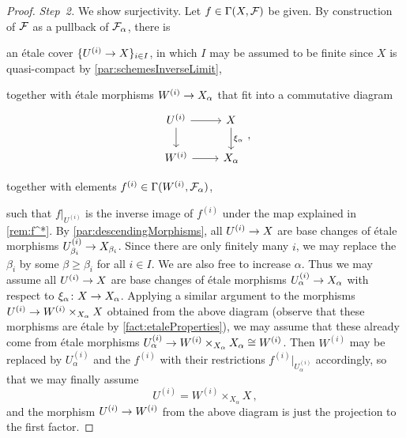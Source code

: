 \begin{proof}
	\emph{Step~2.} We show surjectivity. Let $f\in\operatorname{\Gamma}(X,\mathcal{F})$ be given. By construction of $\mathcal{F}$ as a pullback of $\mathcal{F}_\alpha$, there is
	\begin{numerate}
		\item an étale cover $\{U^{(i)}\morphism X\}_{i\in I}$, in which $I$ may be assumed to be finite since $X$ is quasi-compact by \cref{par:schemesInverseLimit},
		\item together with étale morphisms $W^{(i)}\morphism X_\alpha$ that fit into a commutative diagram
		\begin{equation*}
			\begin{tikzcd}
				U^{(i)}\dar\rar & X\dar["\xi_\alpha"]\\
				W^{(i)}\rar & X_\alpha
			\end{tikzcd}\,,
		\end{equation*}
		\item together with elements $f^{(i)}\in \operatorname{\Gamma}(W^{(i)},\mathcal{F}_\alpha)$,
	\end{numerate}
	such that $f|_{U^{(i)}}$ is the inverse image of $f^{(i)}$ under the map explained in \cref{rem:f^*}. By \cref{par:descendingMorphisms}, all $U^{(i)}\morphism X$ are base changes of étale morphisms $U^{(i)}_{\beta_i}\morphism X_{\beta_i}$. Since there are only finitely many $i$, we may replace the $\beta_i$ by some $\beta\geq\beta_i$ for all $i\in I$. We are also free to increase $\alpha$. Thus we may assume all $U^{(i)}\morphism X$ are base changes of étale morphisms $U_\alpha^{(i)}\morphism X_\alpha$ with respect to $\xi_\alpha\colon X\morphism X_\alpha$. Applying a similar argument to the morphisms $U^{(i)}\morphism W^{(i)}\times_{X_\alpha}X$ obtained from the above diagram (observe that these morphisms are étale by \cref{fact:etaleProperties}), we may assume that these already come from étale morphisms $U_\alpha^{(i)}\morphism W^{(i)}\times_{X_\alpha}X_\alpha\cong W^{(i)}$. Then $W^{(i)}$ may be replaced by $U_\alpha^{(i)}$ and the $f^{(i)}$ with their restrictions $f^{(i)}|_{U_\alpha^{(i)}}$ accordingly, so that we may finally assume
	\begin{equation*}
		U^{(i)}=W^{(i)}\times_{X_\alpha}X\,,
	\end{equation*}
	and the morphism $U^{(i)}\morphism W^{(i)}$ from the above diagram is just the projection to the first factor.
	

\end{proof}
